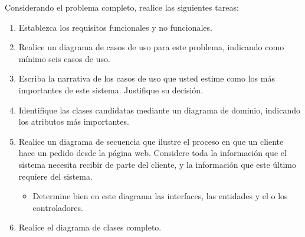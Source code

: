 \documentclass[11pt,letterpaper]{article}
\begin{document}
\begin{spacing}{1.2}
\begin{Problem}
    Considerando el problema completo, realice las siguientes tareas:

    \begin{enumerate}
        \item Establezca los requisitos funcionales y no funcionales.
        \item Realice un diagrama de casos de uso para este problema, indicando como mínimo seis
            casos de uso.
        \item Escriba la narrativa de los  casos de uso que usted estime como los más
            importantes de este sistema. Justifique su decisión.
        \item Identifique las clases candidatas mediante un diagrama de dominio, indicando 
            los atributos más importantes.
        \item Realice un diagrama de secuencia que ilustre el proceso en que un cliente
            hace un pedido desde la página web. Considere toda la información que el sistema necesita
            recibir de parte del cliente, y la información que este último requiere del sistema.
        \begin{itemize}
            \item Determine bien en este diagrama las interfaces, las entidades y el o los controladores.
        \end{itemize}
        \item Realice el diagrama de clases completo.
    \end{enumerate}

\end{Problem}

\end{spacing}
\end{document}
